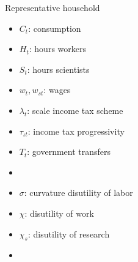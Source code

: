 \documentclass[11pt,aspectratio=169]{beamer}
\begin{document}
\begin{frame}{Representative household}
	\small
	\vspace{4mm}
	\hspace{-8mm}
	\begin{minipage}[t!]{0.26\textwidth}
		\vspace{7mm}
		\begin{itemize}
			\item[] $C_{t}$: consumption\vspace{-2mm}
			\item[] $H_{t}$: hours workers\vspace{-2mm}
			\item[] $S_{t}$: hours scientists\vspace{-2mm}
			\item[] $w_{t}, w_{st}$: wages  %
		\end{itemize}
	\end{minipage}
	\begin{minipage}[t!]{0.37\textwidth}
		\vspace{8mm}
		\begin{itemize}
			\item[] $\lambda_{t}$: scale income tax scheme  \vspace{-2mm}
			\item[] $\tau_{\iota t}$: income tax progressivity
			\vspace{-2mm}	
			\item[] $T_{t}$: government transfers
			\vspace{-2mm}	
			\item[]%
		\end{itemize}
	\end{minipage}
	\begin{minipage}[t!]{0.39\textwidth}
		\vspace{8mm}
		\begin{itemize}
			\item[] $\sigma$: curvature disutility of labor  \vspace{-2mm}
			\item[] $\chi$: disutility of work
			\vspace{-2mm}	
			\item[] $\chi_s$: disutility of research
			\vspace{-2mm}	
			\item[]%
		\end{itemize}
	\end{minipage}
	
\end{frame}
\end{document}
